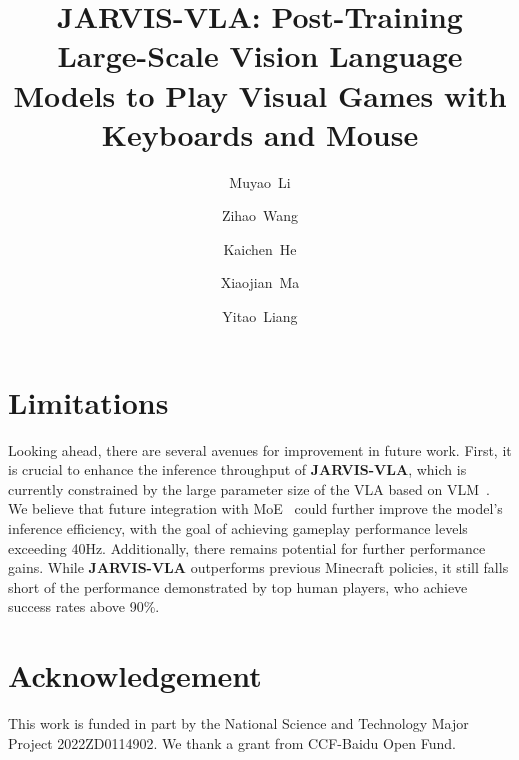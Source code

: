 \documentclass[11pt, a4paper, logo, two column]{craftjarvis}
\title{
JARVIS-VLA: Post-Training Large-Scale Vision Language Models to Play Visual Games with Keyboards and Mouse
}
\author[1$\dag$]{Muyao~Li}
\author[1$\dag$]{Zihao~Wang}
\author[1]{Kaichen~He}
\author[2]{Xiaojian~Ma}
\author[1\textrm{\Letter}]{Yitao~Liang}
\affil[1]{Peking~University}
\affil[2]{BIGAI}
\affil[ \hspace{-0.73ex}]{All authors are affiliated with Team CraftJarvis}
\newcommand{\model}{{\bf JARVIS-VLA}\xspace}
\begin{document}

\maketitle





\section*{Limitations}

Looking ahead, there are several avenues for improvement in future work. First, it is crucial to enhance the inference throughput of \model, which is currently constrained by the large parameter size of the VLA based on VLM~\citep{EdgeVLA}. We believe that future integration with MoE~\citep{MoE,Switch_Transformers} could further improve the model’s inference efficiency, with the goal of achieving gameplay performance levels exceeding 40Hz. Additionally, there remains potential for further performance gains. While \model outperforms previous Minecraft policies, it still falls short of the performance demonstrated by top human players, who achieve success rates above 90\%.

\section*{Acknowledgement}

This work is funded in part by the National Science and Technology Major Project 2022ZD0114902.
We thank a grant from CCF-Baidu Open Fund.









\newpage
\onecolumn
\appendix


\end{document}
